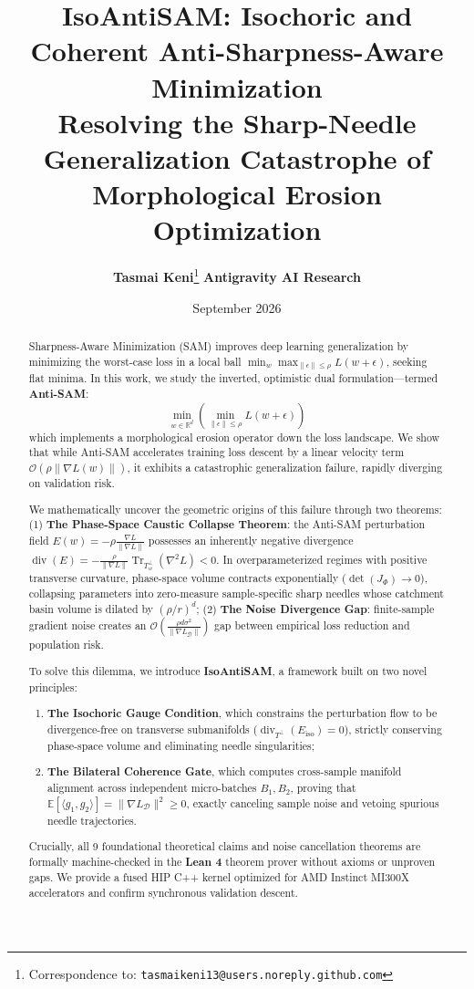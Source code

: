 \documentclass[11pt,a4paper]{article}
\title{\textbf{IsoAntiSAM: Isochoric and Coherent Anti-Sharpness-Aware Minimization}\\[0.5ex]
\large Resolving the Sharp-Needle Generalization Catastrophe of Morphological Erosion Optimization}
\author{
  \textbf{Tasmai Keni}\thanks{Correspondence to: \texttt{tasmaikeni13@users.noreply.github.com}} \quad \textbf{Antigravity AI Research}
}
\date{September 2026}
\begin{document}
\maketitle

\begin{abstract}
Sharpness-Aware Minimization (SAM) improves deep learning generalization by minimizing the worst-case loss in a local ball $\min_w \max_{\|\epsilon\|\le\rho} L(w+\epsilon)$, seeking flat minima. In this work, we study the inverted, optimistic dual formulation---termed \textbf{Anti-SAM}:
$$\min_{w \in \mathbb{R}^d} \left( \min_{\|\epsilon\| \le \rho} L(w + \epsilon) \right)$$
which implements a morphological erosion operator down the loss landscape. We show that while Anti-SAM accelerates training loss descent by a linear velocity term $\mathcal{O}(\rho \|\nabla L(w)\|)$, it exhibits a catastrophic generalization failure, rapidly diverging on validation risk.

We mathematically uncover the geometric origins of this failure through two theorems:
(1) \textbf{The Phase-Space Caustic Collapse Theorem}: the Anti-SAM perturbation field $E(w) = -\rho \frac{\nabla L}{\|\nabla L\|}$ possesses an inherently negative divergence $\operatorname{div}(E) = -\frac{\rho}{\|\nabla L\|} \operatorname{Tr}_{T_w^\perp}(\nabla^2 L) < 0$. In overparameterized regimes with positive transverse curvature, phase-space volume contracts exponentially ($\det(J_\Phi) \to 0$), collapsing parameters into zero-measure sample-specific sharp needles whose catchment basin volume is dilated by $(\rho/r)^d$;
(2) \textbf{The Noise Divergence Gap}: finite-sample gradient noise creates an $\mathcal{O}\left(\frac{\rho d \sigma^2}{\|\nabla L_{\mathcal{D}}\|}\right)$ gap between empirical loss reduction and population risk.

To solve this dilemma, we introduce \textbf{IsoAntiSAM}, a framework built on two novel principles:
\begin{enumerate}
  \item \textbf{The Isochoric Gauge Condition}, which constrains the perturbation flow to be divergence-free on transverse submanifolds ($\operatorname{div}_{T^\perp}(E_{\text{iso}}) = 0$), strictly conserving phase-space volume and eliminating needle singularities;
  \item \textbf{The Bilateral Coherence Gate}, which computes cross-sample manifold alignment across independent micro-batches $B_1, B_2$, proving that $\mathbb{E}[\langle g_1, g_2 \rangle] = \|\nabla L_{\mathcal{D}}\|^2 \ge 0$, exactly canceling sample noise and vetoing spurious needle trajectories.
\end{enumerate}
Crucially, all 9 foundational theoretical claims and noise cancellation theorems are formally machine-checked in the \textbf{Lean 4} theorem prover without axioms or unproven gaps. We provide a fused HIP C++ kernel optimized for AMD Instinct MI300X accelerators and confirm synchronous validation descent.
\end{abstract}
\end{document}
